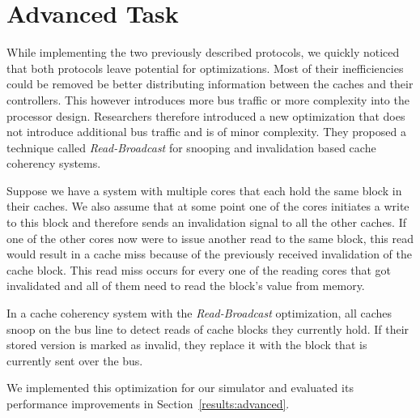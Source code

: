 \section{Advanced Task}
While implementing the two previously described protocols, we quickly noticed that both protocols
leave potential for optimizations. Most of their inefficiencies could be removed be better
distributing information between the caches and their controllers. This however introduces more bus
traffic or more complexity into the processor design. Researchers \cite{read_broadcast_prop1,
    read_broadcast_prop2, read_broadcast_prop3} therefore introduced a new
optimization that does not introduce additional bus traffic and is of minor complexity. They
proposed a technique called \emph{Read-Broadcast}\cite{read_broadcast_analysis} for snooping and
invalidation based cache coherency systems.

Suppose we have a system with multiple cores that each hold the same block in their caches. We also
assume that at some point one of the cores initiates a write to this block and therefore sends an
invalidation signal to all the other caches. If one of the other cores now were to issue another
read to the same block, this read would result in a cache miss because of the previously received
invalidation of the cache block. This read miss occurs for every one of the reading cores that got
invalidated and all of them need to read the block's value from memory.

In a cache coherency system with the \emph{Read-Broadcast} optimization, all caches snoop on the bus
line to detect reads of cache blocks they currently hold. If their stored version is marked as
invalid, they replace it with the block that is currently sent over the bus.

We implemented this optimization for our simulator and evaluated its performance improvements in
Section~\ref{results:advanced}.
